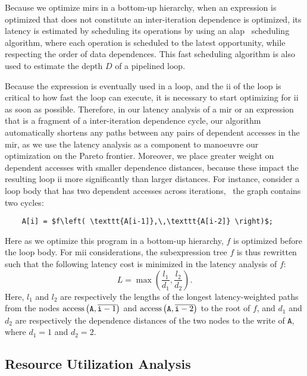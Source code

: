 Because we optimize \glspl{mir} in a bottom-up hierarchy, when an expression
is optimized that does not constitute an inter-iteration dependence is
optimized, its latency is estimated by scheduling its operations by using
an \gls{alap}~\cite{wang_hls} scheduling algorithm, where each operation
is scheduled to the latest opportunity, while respecting the order of data
dependences.  This fast scheduling algorithm is also used to estimate the depth
$D$ of a pipelined loop.

Because the expression is eventually used in a loop, and the \gls{ii} of
the loop is critical to how fast the loop can execute, it is necessary
to start optimizing for \gls{ii} as soon as possible.  Therefore, in our
latency analysis of a \gls{mir} or an expression that is a fragment of a
inter-iteration dependence cycle, our algorithm automatically shortens any
paths between any pairs of dependent accesses in the \gls{mir}\@, as we use the
latency analysis as a component to manoeuvre our optimization on the Pareto
frontier.  Moreover, we place greater weight on dependent accesses with
smaller dependence distances, because these impact the resulting loop \gls{ii}
more significantly than larger distances.  For instance, consider a loop body
that has two dependent accesses across iterations, \ie~the graph contains two
cycles:
\begin{lstlisting}
    A[i] = $f\left( \texttt{A[i-1]},\,\texttt{A[i-2]} \right)$;
\end{lstlisting}
Here as we optimize this program in a bottom-up hierarchy, $f$ is optimized
before the loop body.  For \gls{mii} considerations, the subexpression tree $f$
is thus rewritten such that the following latency cost is minimized in the latency analysis of $f$:
\begin{equation}
    L = \max \left(
        \frac{l_1}{d_1}, \frac{l_2}{d_2}
    \right).
\end{equation}
Here, $l_1$ and $l_2$ are respectively the lengths
of the longest latency-weighted paths from the nodes
$\operatorname{\mathrm{access}}\left({\texttt{A}}, {\overline{\texttt{i}-1}}\right)$ and
$\operatorname{\mathrm{access}}\left({\texttt{A}}, {\overline{\texttt{i}-2}}\right)$ to the root of $f$, and $d_1$
and $d_2$ are respectively the dependence distances of the two nodes to the
write of \verb|A|, where $d_1 = 1$ and $d_2 = 2$.


\subsection{Resource Utilization Analysis}
\label{lo:sub:resource}

